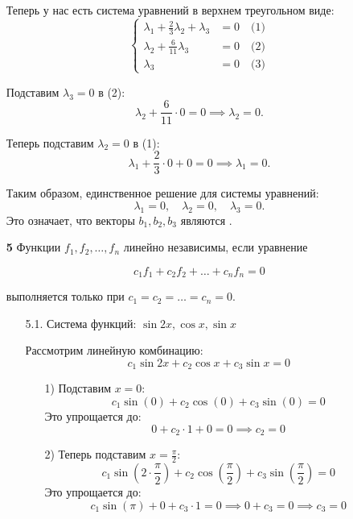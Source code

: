 \documentclass[a4paper]{article}
\newcommand{\case}[1]{\begin{cases} #1 \end{cases}}
\begin{document}
\begin{enumerate}
    Теперь у нас есть система уравнений в верхнем треугольном виде:
    $$
    \case{
    \lambda_1 + \frac{2}{3}\lambda_2 + \lambda_3 &= 0 \quad \text{(1)} \\
    \lambda_2 + \frac{6}{11}\lambda_3 &= 0 \quad \text{(2)} \\
    \lambda_3 &= 0 \quad \text{(3)}
    }
    $$
    
    Подставим $\lambda_3 = 0$ в (2):
    $$
    \lambda_2 + \frac{6}{11} \cdot 0 = 0 \implies \lambda_2 = 0.
    $$

    Теперь подставим $\lambda_2 = 0$ в (1):
    $$
    \lambda_1 + \frac{2}{3} \cdot 0 + 0 = 0 \implies \lambda_1 = 0.
    $$
        
    Таким образом, единственное решение для системы уравнений:
    $$
    \lambda_1 = 0, \quad \lambda_2 = 0, \quad \lambda_3 = 0.
    $$
    Это означает, что векторы $ b_{1}, b_{2}, b_{3} $ являются .\\

    \item[\textbf{5}] Функции $ f_1, f_2, \ldots, f_n $ линейно независимы, если уравнение 

    $$
    c_1 f_1 + c_2 f_2 + \ldots + c_n f_n = 0
    $$
    
    выполняется только при $ c_1 = c_2 = \ldots = c_n = 0 $.

    \begin{enumerate}
        \item[5.1.]Система функций: $ \sin 2x, \cos x, \sin x $

        Рассмотрим линейную комбинацию:
        $$
        c_1 \sin 2x + c_2 \cos x + c_3 \sin x = 0
        $$      
        \begin{enumerate}
            \item[1)]
            Подставим $ x = 0 $:
            $$
            c_1 \sin(0) + c_2 \cos(0) + c_3 \sin(0) = 0
            $$
            Это упрощается до:
            $$
            0 + c_2 \cdot 1 + 0 = 0 \implies c_2 = 0
            $$

            \item[2)]
            Теперь подставим $ x = \frac{\pi}{2} $:
            $$
            c_1 \sin\left(2 \cdot \frac{\pi}{2}\right) + c_2 \cos\left(\frac{\pi}{2}\right) + c_3 \sin\left(\frac{\pi}{2}\right) = 0
            $$
            Это упрощается до:
            $$
            c_1 \sin(\pi) + 0 + c_3 \cdot 1 = 0 \implies 0 + c_3 = 0 \implies c_3 = 0
            $$


\end{enumerate}
\end{enumerate}
\end{enumerate}
\end{document}
